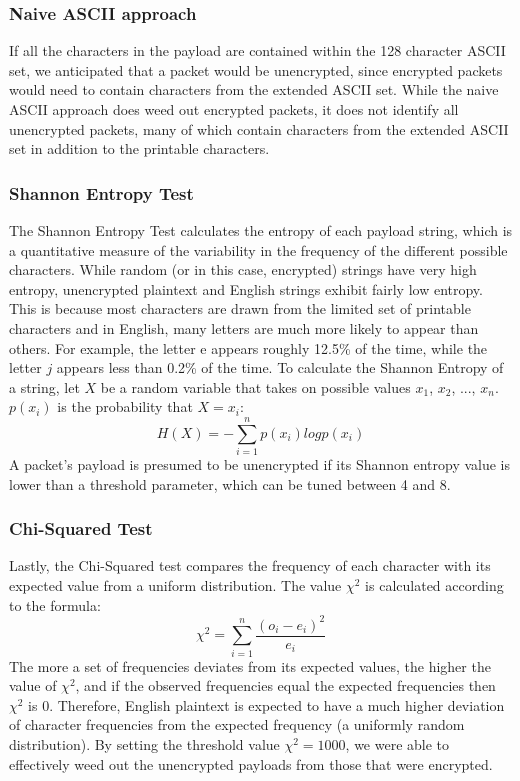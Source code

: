 \subsubsection{Naive ASCII approach}
If all the characters in the payload are contained within the 128 character ASCII set, we anticipated that a packet would be unencrypted, since encrypted packets would need to contain characters from the extended ASCII set. While the naive ASCII approach does weed out encrypted packets, it does not identify all unencrypted packets, many of which contain characters from the extended ASCII set in addition to the printable characters. 

\subsubsection{Shannon Entropy Test}
The Shannon Entropy Test calculates the entropy of each payload string, which is a quantitative measure of the variability in the frequency of the different possible characters. While random (or in this case, encrypted) strings have very high entropy, unencrypted plaintext and English strings exhibit fairly low entropy. This is because most characters are drawn from the limited set of printable characters and in English, many letters are much more likely to appear than others. For example, the letter e appears roughly 12.5\% of the time, while the letter $j$ appears less than 0.2\% of the time. To calculate the Shannon Entropy of a string, let $X$ be a random variable that takes on possible values $x_1$, $x_2$, ..., $x_n$. $p(x_i)$ is the probability that $X = x_i$:
$$H(X) = - \sum_{i = 1}^{n} p(x_i) log p(x_i)$$
A packet's payload is presumed to be unencrypted if its Shannon entropy value is lower than a threshold parameter, which can be tuned between 4 and 8. 

\subsubsection{Chi-Squared Test}
Lastly, the Chi-Squared test compares the frequency of each character with its expected value from a uniform distribution. The value $\chi^2$ is calculated according to the formula:
$$\chi^2 = \sum_{i=1}^{n} \frac{(o_i-e_i)^2}{e_i}$$
The more a set of frequencies deviates from its expected values, the higher the value of $\chi^2$, and if the observed frequencies equal the expected frequencies then $\chi^2$ is 0. Therefore, English plaintext is expected to have a much higher deviation of character frequencies from the expected frequency (a uniformly random distribution). By setting the threshold value $\chi^2 = 1000$, we were able to effectively weed out the unencrypted payloads from those that were encrypted. 

